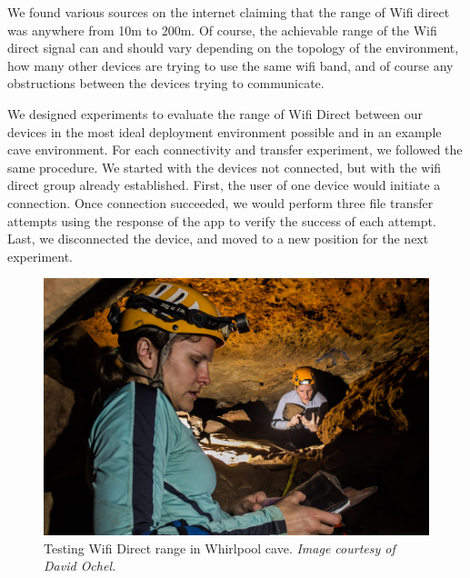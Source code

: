 \documentclass[10pt,twocolumn]{article}
\begin{document}
We found various sources on the internet claiming that the range of Wifi direct was anywhere from 10m to 200m. 
Of course, the achievable range of the Wifi direct signal can and should vary depending on the topology of the environment, how many other devices are trying to use the same wifi band, and of course any obstructions between the devices trying to communicate.

We designed experiments to evaluate the range of Wifi Direct between our devices in the most ideal deployment environment possible and in an example cave environment.
For each connectivity and transfer experiment, we followed the same procedure. 
We started with the devices not connected, but with the wifi direct group already established.
First, the user of one device would initiate a connection.
Once connection succeeded, we would perform three file transfer attempts using the response of the app to verify the success of each attempt.
Last, we disconnected the device, and moved to a new position for the next experiment.

\begin{figure}
\includegraphics[width=\columnwidth]{cavewifi}
\caption{Testing Wifi Direct range in Whirlpool cave. \textit{Image courtesy of David Ochel.}}
\end{figure}

\end{document}
